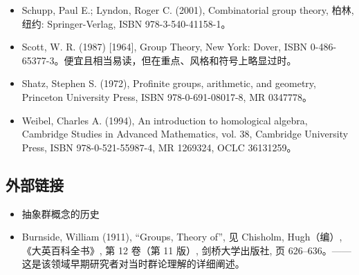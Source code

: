 \begin{itemize}
\item Schupp, Paul E.; Lyndon, Roger C. (2001), Combinatorial group theory, 柏林, 纽约: Springer-Verlag, ISBN 978-3-540-41158-1。
\item Scott, W. R. (1987) [1964], Group Theory, New York: Dover, ISBN 0-486-65377-3。便宜且相当易读，但在重点、风格和符号上略显过时。
\item Shatz, Stephen S. (1972), Profinite groups, arithmetic, and geometry, Princeton University Press, ISBN 978-0-691-08017-8, MR 0347778。
\item Weibel, Charles A. (1994), An introduction to homological algebra, Cambridge Studies in Advanced Mathematics, vol. 38, Cambridge University Press, ISBN 978-0-521-55987-4, MR 1269324, OCLC 36131259。
\end{itemize}
\subsection{外部链接}
\begin{itemize}
\item 抽象群概念的历史
\item Burnside, William (1911), “Groups, Theory of”, 见 Chisholm, Hugh（编）, 《大英百科全书》, 第 12 卷（第 11 版）, 剑桥大学出版社, 页 626–636。——这是该领域早期研究者对当时群论理解的详细阐述。
\end{itemize}